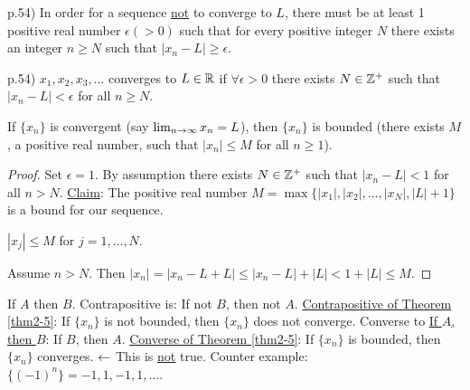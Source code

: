\documentclass[]{article}
\begin{document}
p.54) In order for a sequence \ul{not} to converge to $L$, there must be at least 1 positive real number $\epsilon(>0)$ such that for every positive integer $N$ there exists an integer $n\geq N$ such that $|x_n-L|\geq \epsilon$.


p.54) $x_1,x_2,x_3,\dots$ converges to $L\in\mathbb{R}$ if $\forall \epsilon >0$ there exists $N\in\mathbb{Z}^+$ such that $|x_n-L|<\epsilon$ for all $n\geq N$.
\begin{theorem}
	If $\{x_n\}$ is convergent (say $\lim_{n\rightarrow\infty} x_n =L$), then $\{x_n\}$ is bounded (there exists $M$, a positive real number, such that $|x_n|\leq M$ for all $n\geq 1$). 
	\label{thm2-5}
\end{theorem}
\begin{proof}
	Set $\epsilon=1$. By assumption there exists $N\in\mathbb{Z}^+$ such that $|x_n-L|<1$ for all $n>N$.
	\ul{Claim}: The positive real number $M= \max{\{|x_1|,|x_2|,\dots,|x_N|,|L|+1\}}$ is a bound for our sequence.
	\begin{note}
		$|x_j|\leq M$ for $j=1,\dots,N$.
	\end{note}
	Assume $n>N$. Then $|x_n| = |x_n-L+L|\leq |x_n-L| + |L| < 1+|L| \leq M$.
\end{proof}
If $A$ then $B$. Contrapositive is: If not $B$, then not $A$.
\ul{Contrapositive of Theorem \ref{thm2-5}}: If $\{x_n\}$ is not bounded, then $\{x_n\}$ does not converge.
Converse to \ul{If $A$, then $B$}: If $B$, then $A$.
\ul{Converse of Theorem \ref{thm2-5}}: If $\{x_n\}$ is bounded, then $\{x_n\}$ converges. $\leftarrow$ This is \ul{not} true. Counter example: $\{(-1)^n\} = -1,1,-1,1,\dots$.
\end{document}
